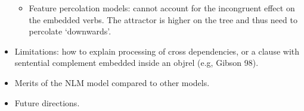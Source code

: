 \begin{itemize}
\begin{itemize}
        \item Feature percolation models: cannot account for the incongruent effect on the embedded verbs. The attractor is higher on the tree and thus need to percolate `downwards'.
    \end{itemize}   

    \item Limitations: how to explain processing of cross dependencies, or a clause with sentential complement embedded inside an objrel (e.g, Gibson 98).
    \item Merits of the NLM model compared to other models.    
    
    
    \item Future directions. 
    
\end{itemize}